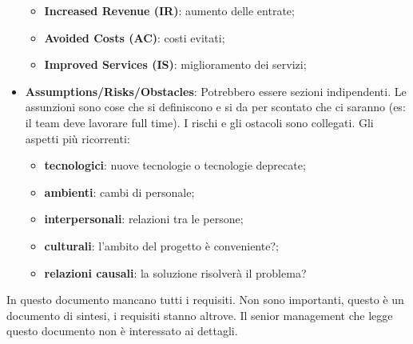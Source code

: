\begin{itemize}
	\begin{itemize}
		\item \textbf{Increased Revenue (IR)}: aumento delle entrate;
		\item \textbf{Avoided Costs (AC)}: costi evitati;
		\item \textbf{Improved Services (IS)}: miglioramento dei servizi;
	\end{itemize}
	\item \textbf{Assumptions/Risks/Obstacles}: Potrebbero essere sezioni indipendenti. Le assunzioni sono cose che si definiscono e si da per scontato che ci saranno (es: il team deve lavorare full time). I rischi e gli ostacoli sono collegati. Gli aspetti più ricorrenti:
	\begin{itemize}
		\item \textbf{tecnologici}: nuove tecnologie o tecnologie deprecate;
		\item \textbf{ambienti}: cambi di personale;
		\item \textbf{interpersonali}: relazioni tra le persone;
		\item \textbf{culturali}: l'ambito del progetto è conveniente?;
		\item \textbf{relazioni causali}: la soluzione risolverà il problema?
	\end{itemize}
\end{itemize}
In questo documento mancano tutti i requisiti. Non sono importanti, questo è un documento di sintesi, i requisiti stanno altrove. Il senior management che legge questo documento non è interessato ai dettagli.

